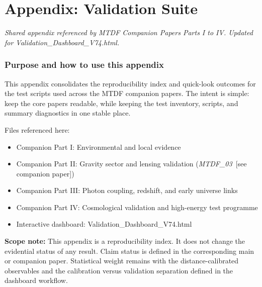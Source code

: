 \documentclass[11pt,a4paper]{article}
\begin{document}
\part{Appendix: Validation Suite}

\begin{center}\itshape Shared appendix referenced by MTDF Companion Papers Parts I to IV. Updated for Validation\_\allowbreak{}Dashboard\_\allowbreak{}V74.html.\end{center}

\begin{abstract}
This appendix consolidates the reproducibility index, test scripts, and summary diagnostics for the MTDF validation suite. It provides the complete inventory of tests referenced across the companion papers (MTDF\_\allowbreak{}01 through MTDF\_\allowbreak{}08), including script locations, input data, and pass/\allowbreak{}fail outcomes under the V18 strict protocol.
\end{abstract}

\section{Purpose and how to use this appendix}
This appendix consolidates the reproducibility index and quick-look outcomes for the test scripts used across the MTDF companion papers.
  The intent is simple: keep the core papers readable, while keeping the test inventory, scripts, and summary diagnostics in one stable place.

Files referenced here:

\begin{itemize}
  \item Companion Part I: Environmental and local evidence
  \item Companion Part II: Gravity sector and lensing validation (\textit{MTDF\_\allowbreak{}03}~[see companion paper])
  \item Companion Part III: Photon coupling, redshift, and early universe links
  \item Companion Part IV: Cosmological validation and high-energy test programme
  \item Interactive dashboard: Validation\_\allowbreak{}Dashboard\_\allowbreak{}V74.html
\end{itemize}

\begin{mdframed}[linecolor=accent,linewidth=0.5pt,backgroundcolor=callout-bg,leftline=true,rightline=true,topline=true,bottomline=true,innerleftmargin=8pt,innerrightmargin=8pt,innertopmargin=6pt,innerbottommargin=6pt]
\textbf{Scope note:}
    This appendix is a reproducibility index. It does not change the evidential status of any result. Claim status is defined in the corresponding main or companion paper. Statistical weight remains with the distance-calibrated observables and the calibration versus validation separation defined in the dashboard workflow.
\end{mdframed}
\end{document}
